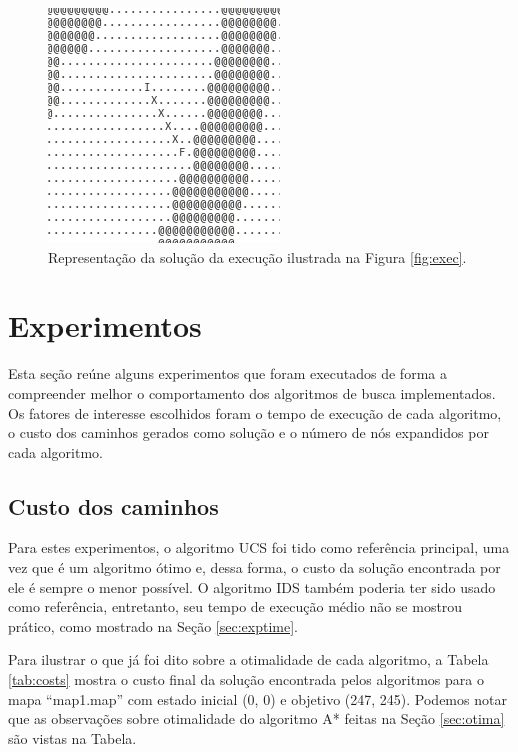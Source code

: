 \documentclass[12pt]{article}
\begin{document}
\begin{figure}[htp!]
	\begin{center}
	  \includegraphics[scale=0.8]{mapex.png}
	\end{center}
	\caption{Representação da solução da execução ilustrada na Figura \ref{fig:exec}.}
	\label{fig:mapex}
\end{figure}

\section{Experimentos}

Esta seção reúne alguns experimentos que foram executados de forma a compreender melhor o comportamento dos algoritmos de busca implementados. Os fatores de interesse escolhidos foram o tempo de execução de cada algoritmo, o custo dos caminhos gerados como solução e o número de nós expandidos por cada algoritmo.

\subsection{Custo dos caminhos}

Para estes experimentos, o algoritmo UCS foi tido como referência principal, uma vez que é um algoritmo ótimo e, dessa forma, o custo da solução encontrada por ele é sempre o menor possível. O algoritmo IDS também poderia ter sido usado como referência, entretanto, seu tempo de execução médio não se mostrou prático, como mostrado na Seção \ref{sec:exptime}.

Para ilustrar o que já foi dito sobre a otimalidade de cada algoritmo, a Tabela \ref{tab:costs} mostra o custo final da solução encontrada pelos algoritmos para o mapa ``map1.map'' com estado inicial (0, 0) e objetivo (247, 245). Podemos notar que as observações sobre otimalidade do algoritmo A* feitas na Seção \ref{sec:otima} são vistas na Tabela.
\end{document}
